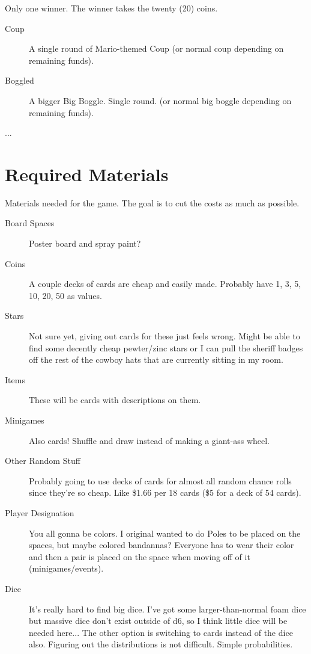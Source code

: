 \documentclass{article}
\begin{document}
Only one winner.  The winner takes the twenty (20) coins.

\begin{description}
\item[Coup] A single round of Mario-themed Coup (or normal coup depending on remaining funds).
\item[Boggled] A bigger Big Boggle.  Single round. (or normal big boggle depending on remaining funds).
\item[...]
\end{description}

\section{Required Materials}

Materials needed for the game.  The goal is to cut the costs as much as possible.

\begin{description}
\item[Board Spaces] Poster board and spray paint?

\item[Coins] A couple decks of cards are cheap and easily made.
Probably have 1, 3, 5, 10, 20, 50 as values.

\item[Stars] Not sure yet, giving out cards for these just feels wrong. Might be able to find
some decently cheap pewter/zinc stars or I can pull the sheriff badges off the rest of the
cowboy hats that are currently sitting in my room.

\item[Items] These will be cards with descriptions on them.

\item[Minigames] Also cards! Shuffle and draw instead of making a giant-ass wheel.

\item[Other Random Stuff] Probably going to use decks of cards for almost all random
chance rolls since they're so cheap.  Like \$1.66 per 18 cards (\$5 for a deck of 54 cards).

\item[Player Designation] You all gonna be colors.  I original wanted to do Poles to be placed on the spaces,
but maybe colored bandannas?  Everyone has to wear their color and then a pair is placed on the space when
moving off of it (minigames/events).

\item[Dice] It's really hard to find big dice.  I've got some larger-than-normal foam dice but massive
dice don't exist outside of d6, so I think little dice will be needed here... The other option is switching
to cards instead of the dice also.  Figuring out the distributions is not difficult.  Simple probabilities.
\end{description}
\end{document}
